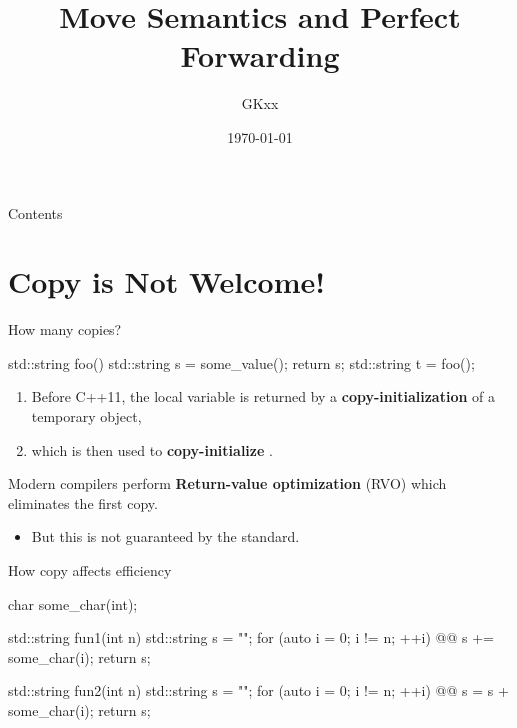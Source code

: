 \documentclass{beamer}
\title{Move Semantics and Perfect Forwarding}
\author{GKxx}
\date{\today}
\begin{document}
\begin{frame}
	\maketitle
\end{frame}

\begin{frame}{Contents}
	\tableofcontents
\end{frame}


\section{Copy is Not Welcome!}

\begin{frame}[fragile]{How many copies?}
  \begin{cpp}
std::string foo() {
  std::string s = some_value();
  return s;
}
std::string t = foo();
  \end{cpp}
  \pause
  \begin{enumerate}
    \item Before C++11, the local variable  is returned by a \textbf{copy-initialization} of a temporary object,
    \item which is then used to \textbf{copy-initialize} .
    \pause
  \end{enumerate}
  Modern compilers perform \textbf{Return-value optimization} (RVO) which eliminates the first copy.
  \begin{itemize}
    \item But this is not guaranteed by the standard.
  \end{itemize}
\end{frame}

\begin{frame}[fragile]{How copy affects efficiency}
  \begin{cpp}
char some_char(int);

std::string fun1(int n) {
  std::string s = "";
  for (auto i = 0; i != n; ++i)
@\pinkbox @    s += some_char(i);
  return s;
}

std::string fun2(int n) {
  std::string s = "";
  for (auto i = 0; i != n; ++i)
@\pinkbox @    s = s + some_char(i);
  return s;
}
  \end{cpp}
\end{frame}
\end{document}
